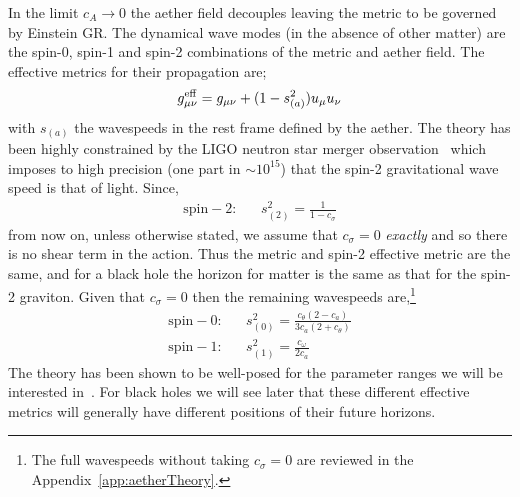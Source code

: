 \documentclass[12pt]{article}
\numberwithin{equation}{section}
\newcommand{\nl}{\nonumber \\}
\begin{document}
In the limit $c_A \to 0$ the aether field decouples leaving the metric to be governed by Einstein GR. 
The dynamical wave modes (in the absence of other matter) are the spin-0, spin-1 and spin-2 combinations of the metric and aether field. The effective metrics for their propagation are;
\begin{eqnarray}
\label{eq:effmetric}
g^{\rm eff}_{\mu\nu} = g_{\mu\nu} + (1 - s_{(a)}^2) u_\mu u_\nu
\end{eqnarray}
with $s_{(a)}$ the wavespeeds in the rest frame defined by the aether.
The theory has been highly constrained by the LIGO neutron star merger observation~\cite{TheLIGOScientific:2017qsa,Creminelli:2017sry} which imposes to high precision (one part in $\sim 10^{15}$) that the spin-2 gravitational wave speed is that of light. Since,
\begin{eqnarray}
\mathrm{spin-2}: && s_{(2)}^2 = \frac{1}{1 - c_{\sigma}}
\end{eqnarray}
from now on, unless otherwise stated, we assume that $c_\sigma = 0$ \emph{exactly} and so there is no shear term in the action. Thus the metric and spin-2 effective metric are the same, and for a black hole the horizon for matter is the same as that for the spin-2 graviton. Given that $c_\sigma = 0$ then the remaining wavespeeds are,\footnote{The full wavespeeds without taking $c_\sigma = 0$ are reviewed in the Appendix~\ref{app:aetherTheory}.}
\begin{eqnarray}
\mathrm{spin-0}: && s_{(0)}^2 = \frac{ c_\theta \left( 2 - c_a \right) }{ 3 c_a \left( 2 + c_\theta \right) } \nl
\mathrm{spin-1}: && s_{(1)}^2 = \frac{ c_\omega }{2 c_a} 
\end{eqnarray}
The theory has been shown to be well-posed for the parameter ranges we will be interested in~\cite{Sarbach:2019yso}. For black holes we will see later that these different effective metrics will generally have different positions of their future horizons. 
\end{document}
